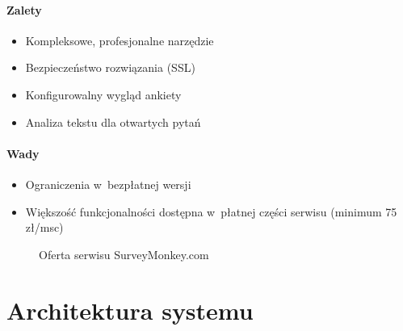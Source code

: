 \documentclass[12pt,a4paper,notitlepage]{article}
\begin{document}
\paragraph{Zalety}
\begin{itemize}
\item Kompleksowe, profesjonalne narzędzie
\item Bezpieczeństwo rozwiązania (SSL)
\item Konfigurowalny wygląd ankiety
\item Analiza tekstu dla otwartych pytań
\end{itemize}

\paragraph{Wady}
\begin{itemize}
\item Ograniczenia w~bezpłatnej wersji
\item Większość funkcjonalności dostępna w~płatnej części serwisu (minimum 75 zł/msc)
\end{itemize}

\begin{figure}[H]
\begin{center}
\caption{Oferta serwisu SurveyMonkey.com}
\end{center}
\end{figure}

\newpage

\section{Architektura systemu}
\end{document}
